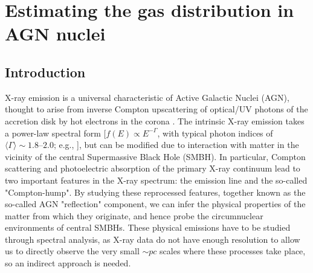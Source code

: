 
\chapter{Estimating the gas distribution in AGN nuclei} \label{ch:gas_distribution}



\section{Introduction}
X-ray emission is a universal characteristic of Active Galactic Nuclei (AGN), thought to arise from inverse Compton upscattering of optical/UV photons of the accretion disk by hot electrons in the corona  \citep[e.g.,][]{1991ApJ...380L..51H}. The intrinsic X-ray emission takes a power-law spectral form  [$f(E){\propto}E^{-\Gamma}$, with  typical photon indices of ${\langle}\Gamma{\rangle}{\sim}1.8$--$2.0$; e.g., \citealt{1994MNRAS.268..405N, 2009ApJ...690.1322W, 2011A&A...530A..42C}], but can be modified due to interaction with matter in the vicinity of the central Supermassive Black Hole (SMBH). In particular, Compton scattering and photoelectric absorption of the primary X-ray continuum lead to two important features in the X-ray spectrum: the \kalfa{} emission line and the so-called "Compton-hump". By studying these reprocessed features, together known as the so-called AGN "reflection" component, we can infer the physical properties of the matter from which they originate, and hence probe the circumnuclear environments of central SMBHs. These physical emissions have to be studied through spectral analysis, as X-ray data do not have enough resolution to allow us to directly observe the very small $\sim pc$ scales where these processes take place, so an indirect approach is needed.

